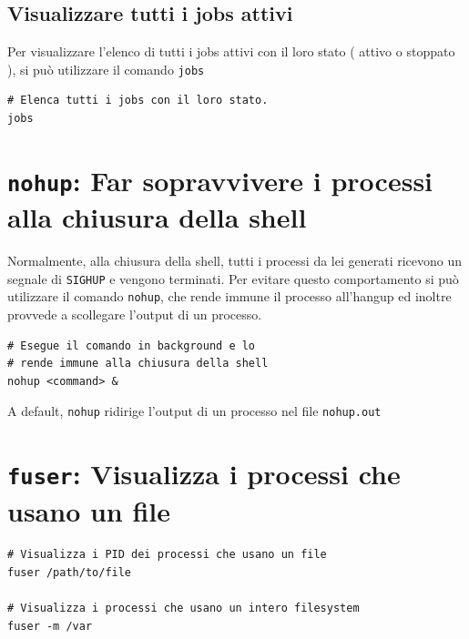 \documentclass[a4paper]{report}
\newenvironment{info}{\begin{tcolorbox}[fonttitle=\sffamily\bfseries\large,title=Info,colframe=blue!75!white]}{\end{tcolorbox}}
\newenvironment{code}{\begin{tcolorbox}[size=small]}{\end{tcolorbox}}
\begin{document}
\subsection{Visualizzare tutti i jobs attivi}

Per visualizzare l'elenco di tutti i jobs attivi con il loro stato ( attivo o stoppato ), si può utilizzare il comando \texttt{jobs}
\begin{code} 
\begin{lstlisting}
# Elenca tutti i jobs con il loro stato.
jobs
\end{lstlisting}
\end{code}

\section{\texttt{nohup}: Far sopravvivere i processi alla chiusura della shell}

Normalmente, alla chiusura della shell, tutti i processi da lei generati ricevono un segnale di \texttt{SIGHUP} e vengono terminati. Per evitare questo comportamento si può utilizzare il comando \texttt{nohup}, che rende immune il processo all'hangup ed inoltre provvede a scollegare l'output di un processo.

\begin{code} 
\begin{lstlisting}
# Esegue il comando in background e lo
# rende immune alla chiusura della shell
nohup <command> &
\end{lstlisting}
\end{code}

\begin{info}
	A default, \texttt{nohup} ridirige l'output di un processo nel file \texttt{nohup.out}
\end{info}

\section{\texttt{fuser}: Visualizza i processi che usano un file}

\begin{code} 
\begin{lstlisting}
# Visualizza i PID dei processi che usano un file
fuser /path/to/file

# Visualizza i processi che usano un intero filesystem
fuser -m /var
\end{lstlisting}
\end{code}
\end{document}
